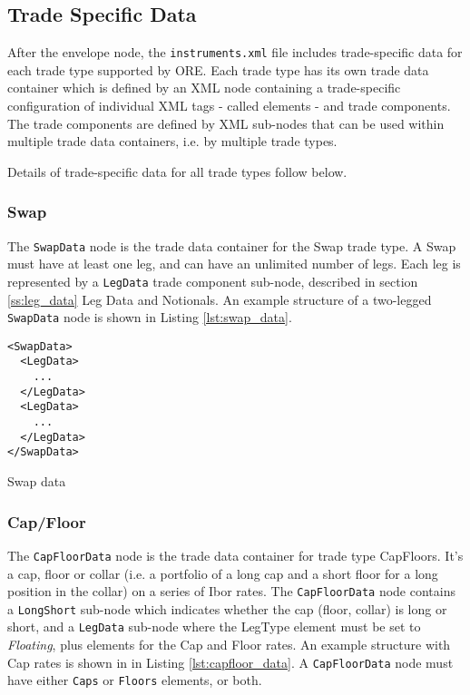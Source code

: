 \subsection{Trade Specific Data}

After the envelope node, the {\tt instruments.xml} file includes trade-specific data for each trade type supported by
ORE. Each trade type has its own trade data container which is defined by an XML node containing a trade-specific
configuration of individual XML tags - called elements - and trade components. The trade components are defined by XML
sub-nodes that can be used within multiple trade data containers, i.e.  by multiple trade types.

\vspace{1em}

Details of  trade-specific data for all trade types follow below.

\subsubsection{Swap}

The \lstinline!SwapData! node is the trade data container for the Swap trade type. A Swap must have at least one leg,
and can have an unlimited number of legs. Each leg is represented by a \lstinline!LegData! trade component sub-node,
described in section \ref{ss:leg_data} Leg Data and Notionals. An example structure of a two-legged \lstinline!SwapData!
node is shown in Listing \ref{lst:swap_data}.

\begin{listing}[H]
\begin{verbatim}
<SwapData>
  <LegData>
    ...
  </LegData>
  <LegData>
    ...
  </LegData>
</SwapData>
\end{verbatim}
\caption{Swap data}
\label{lst:swap_data}
\end{listing}

\subsubsection{Cap/Floor}

The \lstinline!CapFloorData! node is the trade data container for trade type CapFloors.  It's a cap, floor or collar
(i.e. a portfolio of a long cap and a short floor for a long position in the collar) on a series of Ibor rates. The
\lstinline!CapFloorData! node contains a \lstinline!LongShort! sub-node which indicates whether the cap (floor, collar)
is long or short, and a \lstinline!LegData!  sub-node where the LegType element must be set to \emph{Floating}, plus
elements for the Cap and Floor rates. An example structure with Cap rates is shown in in Listing
\ref{lst:capfloor_data}. A \lstinline!CapFloorData! node must have either \lstinline!Caps! or \lstinline!Floors!
elements, or both.

